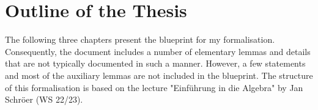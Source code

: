 \section*{Outline of the Thesis}
The following three chapters present the blueprint for my formalisation.
Consequently, the document includes a number of elementary lemmas and details that are not typically documented in such a manner. 
However, a few statements and most of the auxiliary lemmas are not included in the blueprint.
The structure of this formalisation is based on the lecture "Einführung in die Algebra" by Jan Schröer (WS 22/23).